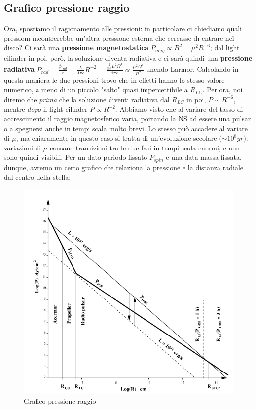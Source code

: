 \subsection{Grafico pressione raggio}
Ora, spostiamo il ragionamento alle pressioni: in particolare ci chiediamo quali pressioni incontrerebbe un'altra pressione esterna che cercasse di entrare nel disco?
Ci sarà una \textbf{pressione magnetostatica} $P_{mag}\propto B^2 = \mu^2R^{-6}$; dal light cilinder in poi, però, la soluzione diventa radiativa e ci sarà quindi una \textbf{pressione radiativa} $P_{rad} = \frac{\phi_{rad}}{c} = \frac{L}{4\pi c}R^{-2} = \frac{\frac{2}{3c^3}\mu^2\Omega^4}{4\pi c} \propto \frac{\mu^2\Omega^4}{R^2} $ unendo Larmor.
Calcolando in questa maniera le due pressioni trovo che in effetti hanno lo stesso valore numerico, a meno di un piccolo "salto" quasi impercettibile a $R_{LC}$.
Per ora, noi diremo che \textit{prima} che la soluzione diventi radiativa dal $R_{LC}$ in poi, $P\sim R^{-6}$, mentre \textit{dopo} il light cilinder $P\propto R^{-2}$.
Abbiamo visto che al variare del tasso di accrescimento il raggio magnetosferico varia, portando la NS ad essere una pulsar o a spegnersi anche in tempi scala molto brevi.
Lo stesso può accadere al variare di $\mu$, ma chiaramente in questo caso si tratta di un'evoluzione secolare ($\sim 10^{8}yr $): variazioni di $\mu$ causano transizioni tra le due fasi in tempi scala enormi, e non sono quindi visibili.
Per un dato periodo fissato $P_{spin}$ e una data massa fissata, dunque, avremo un certo grafico che relaziona la pressione e la distanza radiale dal centro della stella:
\begin{figure}[h!]
    \centering
    \includegraphics[width=0.7\linewidth]{Immagini/Grafico_pressione_raggio.png}
    \caption{Grafico pressione-raggio}
    \label{fig: grafico pressione raggio}
\end{figure}\\
